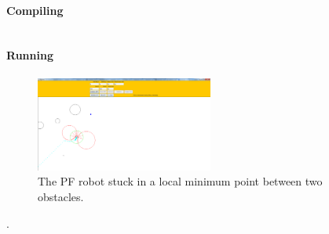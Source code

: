 \documentclass[12pt]{article}
\begin{document}
\paragraph*{Compiling}
\begin{verbatim}
\end{verbatim}
\paragraph*{Running}


\begin{figure}
\centering
\includegraphics[width=220]{two_obstacles.png}
\caption{The PF robot stuck in a local minimum point between two obstacles.}
\end{figure}.
\end{document}

